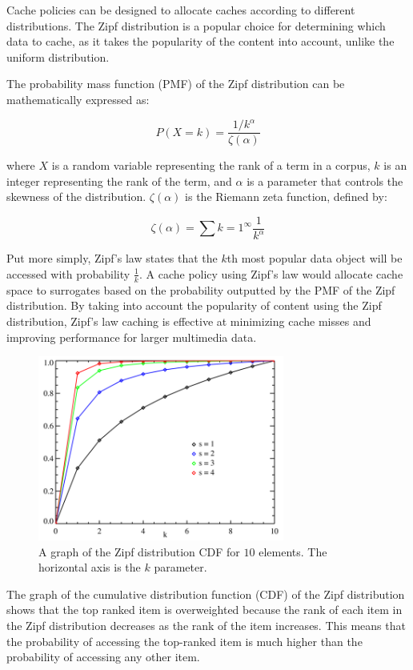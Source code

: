 \documentclass[
	a4paper, %
	10pt, %
	unnumberedsections, %
	twoside, %
]{LTJournalArticle}
\begin{document}
Cache policies can be designed to allocate caches according to different distributions. The Zipf distribution is a popular choice for determining which data to cache, as it takes the popularity of the content into account, unlike the uniform distribution.

The probability mass function (PMF) of the Zipf distribution can be mathematically expressed as:

\[
	P(X=k) = \frac{1/k^{\alpha}}{\zeta(\alpha)}
\] 

where $X$ is a random variable representing the rank of a term in a corpus, $k$ is an integer representing the rank of the term, and $\alpha$ is a parameter that controls the skewness of the distribution. $\zeta(\alpha)$ is the Riemann zeta function, defined by:

\[
	\zeta(\alpha) = \sum{k=1}^{\infty} \frac{1}{k^{\alpha}} 
\] 

Put more simply, Zipf's law states that the $k$th most popular data object will be accessed with probability $\frac{1}{k}$. A cache policy using Zipf's law would allocate cache space to surrogates based on the probability outputted by the PMF of the Zipf distribution. By taking into account the popularity of content using the Zipf distribution, Zipf's law caching is effective at minimizing cache misses and improving performance for larger multimedia data. 

\begin{figure}[h]
	\begin{center}
		\includegraphics[width=8.1cm]{zipf.png}
	\end{center}
	\caption{A graph of the Zipf distribution CDF for $10$ elements. The horizontal axis is the $k$ parameter.}	
\end{figure}

The graph of the cumulative distribution function (CDF) of the Zipf distribution shows that the top ranked item is overweighted because the rank of each item in the Zipf distribution decreases as the rank of the item increases. This means that the probability of accessing the top-ranked item is much higher than the probability of accessing any other item. 
\end{document}
